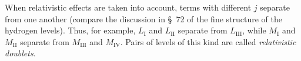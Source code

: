 When relativistic effects are taken into account, terms with different $j$ separate from one another (compare the discussion in \S~72 of the fine structure of the hydrogen levels). Thus, for example, $L_{\mathrm I}$ and $L_{\mathrm{II}}$ separate from $L_{\mathrm{III}}$, while $M_{\mathrm I}$ and $M_{\mathrm{II}}$ separate from $M_{\mathrm{III}}$ and $M_{\mathrm{IV}}$. Pairs of levels of this kind are called \emph{relativistic doublets}.
